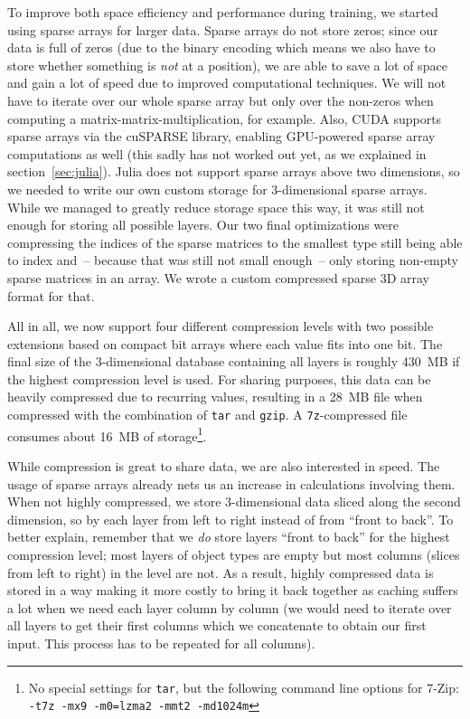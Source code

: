 To improve both space efficiency and performance during training, we
started using sparse arrays for larger data. Sparse arrays do not
store zeros; since our data is full of zeros (due to the binary
encoding which means we also have to store whether something is
\emph{not} at a position), we are able to save a lot of space and gain
a lot of speed due to improved computational techniques. We will not
have to iterate over our whole sparse array but only over the
non-zeros when computing a matrix-matrix-multiplication, for example.
Also, CUDA supports sparse arrays via the cuSPARSE library, enabling
GPU-powered sparse array computations as well (this sadly has not
worked out yet, as we explained in section~\ref{sec:julia}).
Julia does not support sparse arrays above two dimensions, so we
needed to write our own custom storage for 3-dimensional sparse
arrays. While we managed to greatly reduce storage space this way, it
was still not enough for storing all possible layers. Our two final
optimizations were compressing the indices of the sparse matrices to
the smallest type still being able to index and~-- because that was
still not small enough~-- only storing non-empty sparse matrices in an
array. We wrote a custom compressed sparse 3D array format for that.

All in all, we now support four different compression levels with two
possible extensions based on compact bit arrays where each value fits
into one bit. The final size of the 3-dimensional database containing
all layers is roughly 430~MB if the highest compression level is used.
For sharing purposes, this data can be heavily compressed due to
recurring values, resulting in a 28~MB file when compressed with the
combination of \texttt{tar} and \texttt{gzip}. A
\texttt{7z}-compressed file consumes about 16~MB of
storage\footnote{No special settings for \texttt{tar}, but the
  following command line options for 7-Zip: \texttt{-t7z -mx9
    -m0=lzma2 -mmt2 -md1024m}}.
\medskip

While compression is great to share data, we are also interested in
speed. The usage of sparse arrays already nets us an increase in
calculations involving them. When not highly compressed, we store
3-dimensional data sliced along the second dimension, so by each layer
from left to right instead of from ``front to back''. To better
explain, remember that we \emph{do} store layers ``front to back'' for
the highest compression level; most layers of object types are empty
but most columns (slices from left to right) in the level are
not. %
As a result, highly compressed data is stored in a way making it more
costly to bring it back together as caching suffers a lot when we need
each layer column by column (we would need to iterate over all layers
to get their first columns which we concatenate to obtain our first
input. This process has to be repeated for all columns).

